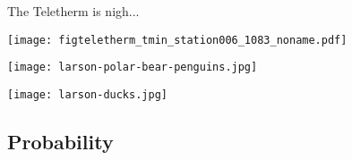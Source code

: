 
\begin{frame}

  \begin{block}{The Teletherm is nigh...}
    \begin{center}
      \texttt{[image: figteletherm\_tmin\_station006\_1083\_noname.pdf]}
    \end{center}
  \end{block}

\end{frame}

\begin{frame}
  
\texttt{[image: larson-polar-bear-penguins.jpg]}

\end{frame}

\begin{frame}
  
\texttt{[image: larson-ducks.jpg]}

\end{frame}


\subsection{Probability}

